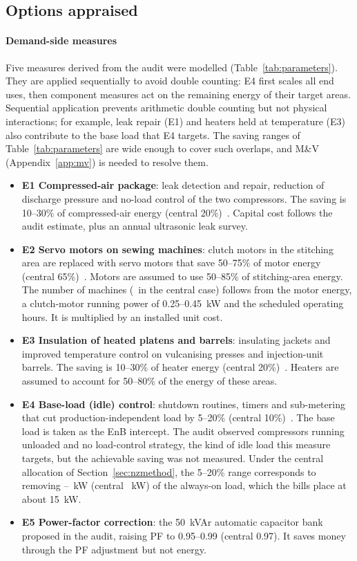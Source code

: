 \documentclass[processes,article,submit,pdftex,moreauthors]{Definitions/mdpi}
\begin{document}
\subsection{Options appraised}
\paragraph{Demand-side measures}
Five measures derived from the audit were modelled (Table~\ref{tab:parameters}). They are applied sequentially to avoid double counting: E4 first scales all end uses, then component measures act on the remaining energy of their target areas. Sequential application prevents arithmetic double counting but not physical interactions; for example, leak repair (E1) and heaters held at temperature (E3) also contribute to the base load that E4 targets. The saving ranges of Table~\ref{tab:parameters} are wide enough to cover such overlaps, and M\&V (Appendix~\ref{app:mv}) is needed to resolve them.
\begin{itemize}
\item \textbf{E1 Compressed-air package}: leak detection and repair, reduction of discharge pressure and no-load control of the two compressors. The saving is 10--30\% of compressed-air energy (central 20\%)~\cite{doe2016compressed}. Capital cost follows the audit estimate, plus an annual ultrasonic leak survey.
\item \textbf{E2 Servo motors on sewing machines}: clutch motors in the stitching area are replaced with servo motors that save 50--75\% of motor energy (central 65\%)~\cite{nemesa2023}. Motors are assumed to use 50--85\% of stitching-area energy. The number of machines (\nNSewing\ in the central case) follows from the motor energy, a clutch-motor running power of 0.25--0.45~kW and the scheduled operating hours. It is multiplied by an installed unit cost.
\item \textbf{E3 Insulation of heated platens and barrels}: insulating jackets and improved temperature control on vulcanising presses and injection-unit barrels. The saving is 10--30\% of heater energy (central 20\%)~\cite{kent2018}. Heaters are assumed to account for 50--80\% of the energy of these areas.
\item \textbf{E4 Base-load (idle) control}: shutdown routines, timers and sub-metering that cut production-independent load by 5--20\% (central 10\%)~\cite{mouzon2007,kara2011}. The base load is taken as the EnB intercept. The audit observed compressors running unloaded and no load-control strategy, the kind of idle load this measure targets, but the achievable saving was not measured. Under the central allocation of Section~\ref{sec:nzmethod}, the 5--20\% range corresponds to removing \nEFourKWLo--\nEFourKWHi~kW (central \nEFourKW~kW) of the always-on load, which the bills place at about 15~kW.
\item \textbf{E5 Power-factor correction}: the 50~kVAr automatic capacitor bank proposed in the audit, raising PF to 0.95--0.99 (central 0.97). It saves money through the PF adjustment but not energy.
\end{itemize}
\end{document}
